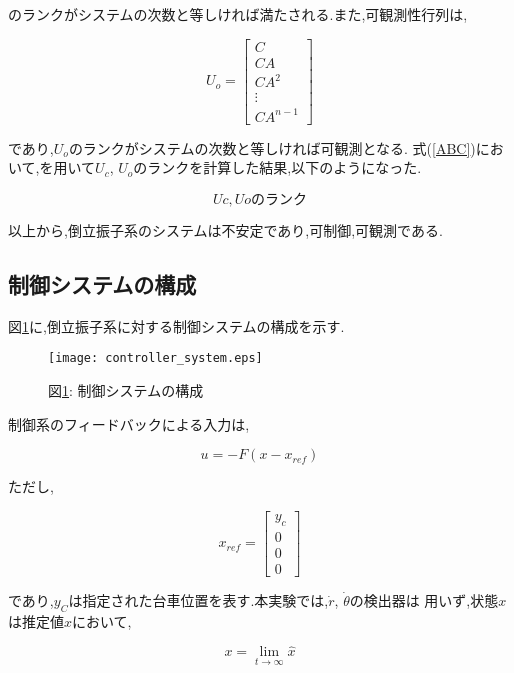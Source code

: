 のランクがシステムの次数と等しければ満たされる.また,可観測性行列は,

$$
    U_{o} = 
    \left[
        \begin{array}{c}
            C \\
            CA \\
            CA^2 \\
            \vdots \\
            CA^{n-1}
        \end{array}
    \right]
$$

であり,$U_{o}$のランクがシステムの次数と等しければ可観測となる.
式(\ref{ABC})において,\MaTX{}を用いて$U_{c}$, $U_{o}$のランクを計算した結果,以下のようになった.

$$
    Uc, Uoのランク
$$

以上から,倒立振子系のシステムは不安定であり,可制御,可観測である.

\subsection{制御システムの構成}
図\ref{controller_system}に,倒立振子系に対する制御システムの構成を示す.

\begin{figure}[htbp]
    \begin{center}
        \texttt{[image: controller\_system.eps]}
        \caption{図\ref{controller_system}: 制御システムの構成}
        \label{controller_system}
    \end{center}
\end{figure}

制御系のフィードバックによる入力は,

$$
    u = -F \left( x - x_{ref} \right)
$$

ただし,

$$
    x_{ref} =
    \left[
        \begin{array}{c}
            y_{c} \\
            0 \\
            0 \\
            0
        \end{array}
    \right]
$$

であり,$y_{C}$は指定された台車位置を表す.本実験では,$\dot{r}$, $\dot{\theta}$の検出器は
用いず,状態$x$は推定値$\hat{x}$において,

\begin{equation}
    x = \lim_{t \to \infty} \hat{x}
    \label{definition_x}
\end{equation}

